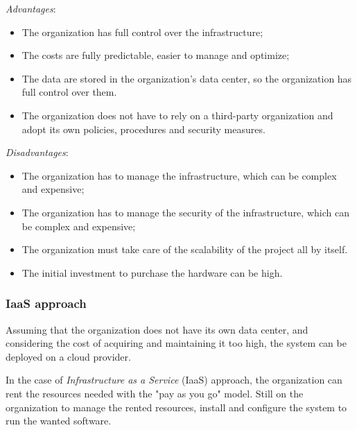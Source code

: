 \textit{Advantages}:
\begin{itemize}
    \itemsep0em
    \item The organization has full control over the infrastructure;
    \item The costs are fully predictable, easier to manage and optimize; 
    \item The data are stored in the organization's data center, so the organization has full control over them.
    \item The organization does not have to rely on a third-party organization and adopt its own policies, procedures and security measures.
\end{itemize}
\textit{Disadvantages}:
\begin{itemize}
    \itemsep0em
    \item The organization has to manage the infrastructure, which can be complex and expensive;
    \item The organization has to manage the security of the infrastructure, which can be complex and expensive;
    \item The organization must take care of the scalability of the project all by itself.
    \item The initial investment to purchase the hardware can be high.
\end{itemize}

\subsubsection{IaaS approach}
\label{subsubsec:iaas}
Assuming that the organization does not have its own data center, and considering the cost of acquiring and maintaining it too high, the system can be deployed on a cloud provider. 

In the case of \textit{Infrastructure as a Service} (IaaS) approach, the organization can rent the resources needed with the "pay as you go" model. 
Still on the organization to manage the rented resources, install and configure the system to run the wanted software.

